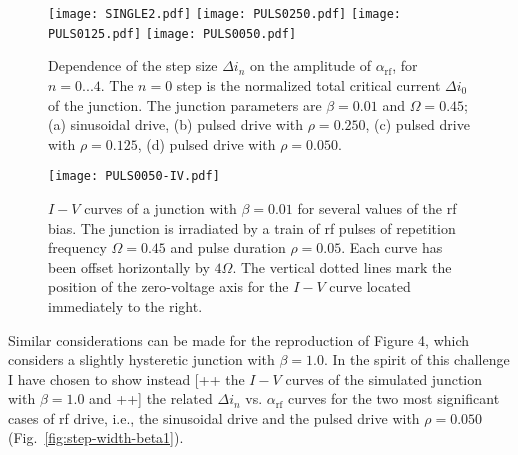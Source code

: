 \begin{figure}[tbh]
	\centering
	\texttt{[image: SINGLE2.pdf]}
	\texttt{[image: PULS0250.pdf]}
	\texttt{[image: PULS0125.pdf]}
	\texttt{[image: PULS0050.pdf]}
	\caption{Dependence of the step size $\Delta i_n$ on the amplitude of  $\alpha_\mathrm{rf}$, for $n = 0. . . 4$. The $n = 0$ step is the normalized total critical current $\Delta i_0$ of the junction. The junction parameters are $\beta = 0. 01$ and $\Omega = 0. 45$; (a) sinusoidal drive, (b) pulsed drive with $\rho = 0. 250$, (c) pulsed drive with $\rho = 0. 125$, (d) pulsed drive with $\rho = 0. 050$.}
	\label{fig:step-width}
\end{figure}

\begin{figure}[tbh]
	\centering
	\texttt{[image: PULS0050-IV.pdf]}
	\caption{$I - V$ curves of a junction with $\beta = 0.01$ for several values of the rf bias. The junction is  irradiated by a train of rf pulses of repetition frequency $\Omega = 0.45$ and pulse duration $\rho = 0.05$. Each curve has been offset horizontally by $4 \Omega$. The vertical dotted lines mark the position of the zero-voltage axis for the $I - V$ curve located immediately to the right.}
	\label{fig:pulsed-ivs}
\end{figure}


Similar considerations can be made for the reproduction of Figure 4, which considers a slightly hysteretic junction with $\beta = 1.0$. In the spirit of this challenge I have chosen to show instead [++ the $I - V$ curves of the simulated junction with $\beta = 1.0$ and ++] the related $\Delta i_n$ vs. $\alpha_\mathrm{rf}$ curves for the two most significant cases of rf drive, i.e., the sinusoidal drive and the pulsed drive with $\rho = 0.050$ (Fig.~\ref{fig:step-width-beta1}).

